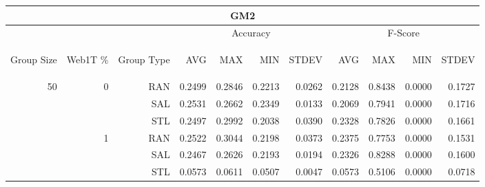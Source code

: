 \begin{center}
\begin{table}[htbp] 
 \begin{center}
\begin{tabular}{ | r | r | r | r | r | r | r | r | r | r | r |}
\hline
\multicolumn{11}{|c|}{GM2}\\
\hline
 & & & \multicolumn{4}{|c|}{Accuracy} & \multicolumn{4}{|c|}{F-Score}\\ \cline{4-11}
\begin{sideways}Group Size\end{sideways} & \begin{sideways}Web1T \%\end{sideways} & \begin{sideways}Group Type\end{sideways} & \begin{sideways}AVG\end{sideways} & \begin{sideways}MAX\end{sideways} & \begin{sideways}MIN\end{sideways} & \begin{sideways}STDEV\end{sideways} & \begin{sideways}AVG\end{sideways} & \begin{sideways}MAX\end{sideways} & \begin{sideways}MIN\end{sideways} & \begin{sideways}STDEV\end{sideways}\\
\hline
\multirow{18}{*}{50}
 & \multirow{3}{*}{0} & RAN & 0.2499 & 0.2846 & 0.2213 & 0.0262 & 0.2128 & 0.8438 & 0.0000 & 0.1727\\ \cline{3-11}
 &   & SAL & 0.2531 & 0.2662 & 0.2349 & 0.0133 & 0.2069 & 0.7941 & 0.0000 & 0.1716\\ \cline{3-11}
 &   & STL & 0.2497 & 0.2992 & 0.2038 & 0.0390 & 0.2328 & 0.7826 & 0.0000 & 0.1661\\ \cline{2-11}
 & \multirow{3}{*}{1} & RAN & 0.2522 & 0.3044 & 0.2198 & 0.0373 & 0.2375 & 0.7753 & 0.0000 & 0.1531\\ \cline{3-11}
 &   & SAL & 0.2467 & 0.2626 & 0.2193 & 0.0194 & 0.2326 & 0.8288 & 0.0000 & 0.1600\\ \cline{3-11}
 &   & STL & 0.0573 & 0.0611 & 0.0507 & 0.0047 & 0.0573 & 0.5106 & 0.0000 & 0.0718\\ \cline{2-11}

\end{tabular}
\end{center}
\end{table}
\end{center}
